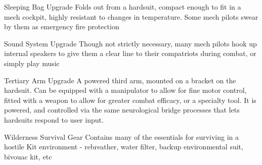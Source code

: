 Sleeping Bag                  Upgrade        Folds out from a hardsuit, compact enough to fit in a mech
                                             cockpit, highly resistant to changes in temperature. Some mech
                                             pilots swear by them as emergency fire protection

Sound System                  Upgrade        Though not strictly necessary, many mech pilots hook up internal
                                             speakers to give them a clear line to their compatriots during
                                             combat, or simply play music

Tertiary Arm                  Upgrade        A powered third arm, mounted on a bracket on the hardsuit. Can
                                             be equipped with a manipulator to allow for fine motor control,
                                             fitted with a weapon to allow for greater combat efficacy, or a
                                             specialty tool. It is powered, and controlled via the same
                                             neurological bridge processes that lets hardsuits respond to user
                                             input.

Wilderness Survival           Gear           Contains many of the essentials for surviving in a hostile
Kit                                          environment - rebreather, water filter, backup environmental suit,
                                             bivouac kit, etc

